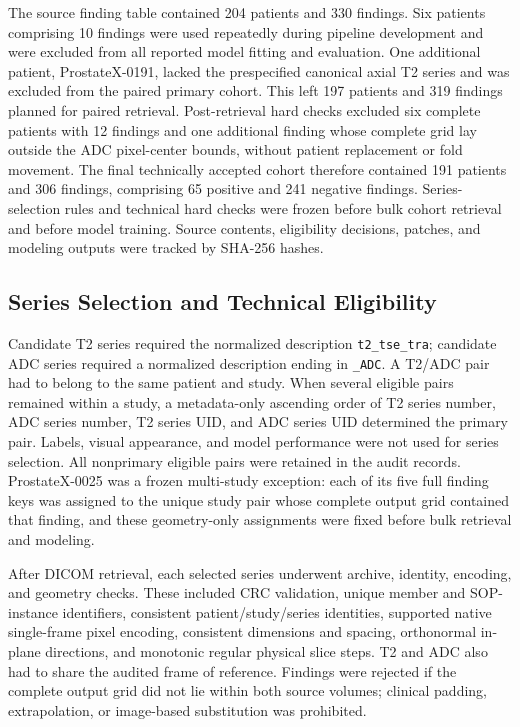 \documentclass[11pt]{article}
\begin{document}
The source finding table contained 204 patients and 330 findings. Six patients comprising 10 findings were used repeatedly during pipeline development and were excluded from all reported model fitting and evaluation. One additional patient, ProstateX-0191, lacked the prespecified canonical axial T2 series and was excluded from the paired primary cohort. This left 197 patients and 319 findings planned for paired retrieval. Post-retrieval hard checks excluded six complete patients with 12 findings and one additional finding whose complete grid lay outside the ADC pixel-center bounds, without patient replacement or fold movement. The final technically accepted cohort therefore contained 191 patients and 306 findings, comprising 65 positive and 241 negative findings. Series-selection rules and technical hard checks were frozen before bulk cohort retrieval and before model training. Source contents, eligibility decisions, patches, and modeling outputs were tracked by SHA-256 hashes.

\subsection{Series Selection and Technical Eligibility}\label{sec:3.2}

Candidate T2 series required the normalized description \texttt{t2\_tse\_tra}; candidate ADC series required a normalized description ending in \texttt{\_ADC}. A T2/ADC pair had to belong to the same patient and study. When several eligible pairs remained within a study, a metadata-only ascending order of T2 series number, ADC series number, T2 series UID, and ADC series UID determined the primary pair. Labels, visual appearance, and model performance were not used for series selection. All nonprimary eligible pairs were retained in the audit records. ProstateX-0025 was a frozen multi-study exception: each of its five full finding keys was assigned to the unique study pair whose complete output grid contained that finding, and these geometry-only assignments were fixed before bulk retrieval and modeling.

After DICOM retrieval, each selected series underwent archive, identity, encoding, and geometry checks. These included CRC validation, unique member and SOP-instance identifiers, consistent patient/study/series identities, supported native single-frame pixel encoding, consistent dimensions and spacing, orthonormal in-plane directions, and monotonic regular physical slice steps. T2 and ADC also had to share the audited frame of reference. Findings were rejected if the complete output grid did not lie within both source volumes; clinical padding, extrapolation, or image-based substitution was prohibited.
\end{document}
